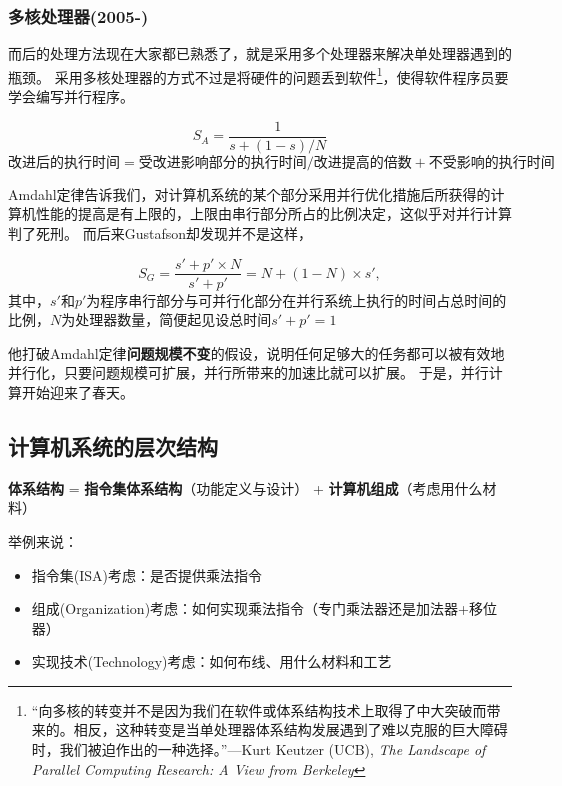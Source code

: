 \subsubsection{多核处理器(2005-)}
而后的处理方法现在大家都已熟悉了，就是采用多个处理器来解决单处理器遇到的瓶颈。
采用多核处理器的方式不过是将硬件的问题丢到软件\footnote{“向多核的转变并不是因为我们在软件或体系结构技术上取得了中大突破而带来的。相反，这种转变是当单处理器体系结构发展遇到了难以克服的巨大障碍时，我们被迫作出的一种选择。”---Kurt Keutzer (UCB), \emph{The Landscape of Parallel Computing Research: A View from Berkeley}}，使得软件程序员要学会编写并行程序。
\begin{theorem}
\label{thm:amdahl}
\[S_A=\frac{1}{s+(1-s)/N}\]
\[\text{改进后的执行时间}=\text{受改进影响部分的执行时间}/\text{改进提高的倍数}+\text{不受影响的执行时间}\]
\end{theorem}
Amdahl定律告诉我们，对计算机系统的某个部分采用并行优化措施后所获得的计算机性能的提高是有上限的，上限由串行部分所占的比例决定，这似乎对并行计算判了死刑。
而后来Gustafson却发现并不是这样，
\begin{theorem}
\[S_G=\frac{s'+p'\times N}{s'+p'}=N+(1-N)\times s',\]
其中，$s'$和$p'$为程序串行部分与可并行化部分在并行系统上执行的时间占总时间的比例，$N$为处理器数量，简便起见设总时间$s'+p'=1$
\end{theorem}
他打破Amdahl定律\textbf{问题规模不变}的假设，说明任何足够大的任务都可以被有效地并行化，只要问题规模可扩展，并行所带来的加速比就可以扩展。
于是，并行计算开始迎来了春天。


\subsection{计算机系统的层次结构}
\begin{center}
\textbf{体系结构} = \textbf{指令集体系结构}（功能定义与设计） + \textbf{计算机组成}（考虑用什么材料）
\end{center}
\par 举例来说：
\begin{itemize}
	\item 指令集(ISA)考虑：是否提供乘法指令
	\item 组成(Organization)考虑：如何实现乘法指令（专门乘法器还是加法器+移位器）
	\item 实现技术(Technology)考虑：如何布线、用什么材料和工艺
\end{itemize}

